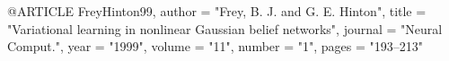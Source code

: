 @ARTICLE {FreyHinton99,
    author  = "Frey, B. J. and G. E. Hinton",
    title   = "{Variational learning in nonlinear Gaussian belief networks}",
    journal = "Neural Comput.",
    year    = "1999",
    volume  = "11",
    number  = "1",
    pages   = "193--213"
}
